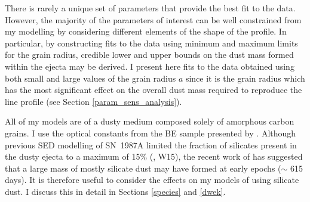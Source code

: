 There is rarely a unique set of parameters that provide the best fit to 
the data.  However, the majority of the parameters of interest can be well 
constrained from my modelling by considering different elements of the 
shape of the profile.  In particular, by constructing fits to the data 
using minimum and maximum limits for the grain radius, credible lower and 
upper bounds on the dust mass formed within the ejecta may be derived.  
I present here fits to the data obtained using both small and large 
values of the grain radius $a$ since it is the grain radius which has the 
most significant effect on the overall dust mass required to reproduce the 
line profile (see Section \ref{param_sens_analysis}).


All of my models are of a dusty medium composed solely of amorphous 
carbon grains. I use the optical constants from the BE sample presented 
by \citet{Zubko1996}.  Although previous SED modelling of SN~1987A  
limited the fraction of silicates present in the dusty ejecta to a maximum 
of 15\% (\citealt{Ercolano2007}, W15), the recent work of \citet{Dwek2015} has suggested that a large mass of mostly silicate dust may have formed at early epochs ($\sim$ 615 days).  It is therefore useful to consider the effects 
on my models of using silicate dust.  I discuss this in detail in 
Sections \ref{species} and \ref{dwek}.



